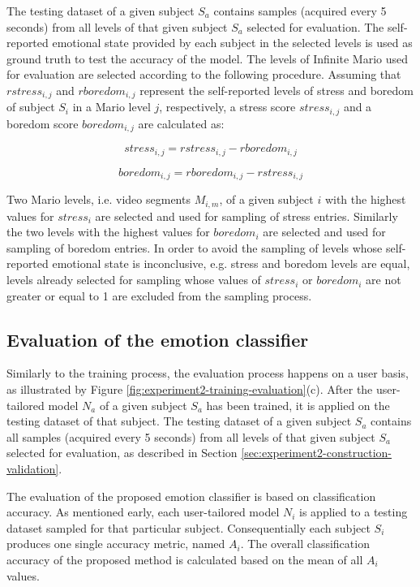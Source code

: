 The testing dataset of a given subject $S_a$ contains samples (acquired every 5 seconds) from all levels of that given subject $S_a$ selected for evaluation. The self-reported emotional state provided by each subject in the selected levels is used as ground truth to test the accuracy of the model. The levels of Infinite Mario used for evaluation are selected according to the following procedure. Assuming that $rstress_{i,j}$ and $rboredom_{i,j}$ represent the self-reported levels of stress and boredom of subject $S_i$ in a Mario level $j$, respectively, a stress score $stress_{i,j}$ and a boredom score $boredom_{i,j}$ are calculated as:

\begin{equation}
  stress_{i,j} = rstress_{i,j} - rboredom_{i,j}
  \label{eq:stress-score}
\end{equation}

\begin{equation}
  boredom_{i,j} = rboredom_{i,j} - rstress_{i,j}
  \label{eq:boredom-score}
\end{equation}

Two Mario levels, i.e. video segments $M_{i,m}$, of a given subject $i$ with the highest values for $stress_i$ are selected and used for sampling of stress entries. Similarly the two levels with the highest values for $boredom_i$ are selected and used for sampling of boredom entries. In order to avoid the sampling of levels whose self-reported emotional state is inconclusive, e.g. stress and boredom levels are equal, levels already selected for sampling whose values of $stress_i$ or $boredom_i$ are not greater or equal to 1 are excluded from the sampling process.

\subsection{Evaluation of the emotion classifier}

Similarly to the training process, the evaluation process happens on a user basis, as illustrated by Figure \ref{fig:experiment2-training-evaluation}(c). After the user-tailored model $N_a$ of a given subject $S_a$ has been trained, it is applied on the testing dataset of that subject. The testing dataset of a given subject $S_a$ contains all samples (acquired every 5 seconds) from all levels of that given subject $S_a$ selected for evaluation, as described in Section \ref{sec:experiment2-construction-validation}.

The evaluation of the proposed emotion classifier is based on classification accuracy. As mentioned early, each user-tailored model $N_i$ is applied to a testing dataset sampled for that particular subject. Consequentially each subject $S_i$ produces one single accuracy metric, named $A_i$. The overall classification accuracy of the proposed method is calculated based on the mean of all $A_i$ values.


